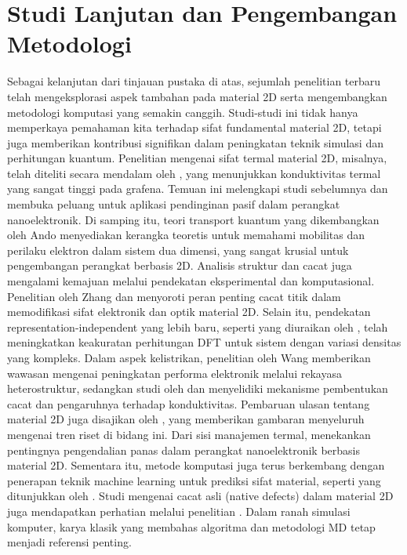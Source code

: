 \section{Studi Lanjutan dan Pengembangan Metodologi}
Sebagai kelanjutan dari tinjauan pustaka di atas, sejumlah penelitian terbaru telah mengeksplorasi aspek tambahan pada material 2D serta mengembangkan metodologi komputasi yang semakin canggih.
Studi-studi ini tidak hanya memperkaya pemahaman kita terhadap sifat fundamental material 2D, tetapi juga memberikan kontribusi signifikan dalam peningkatan teknik simulasi dan perhitungan kuantum.
Penelitian mengenai sifat termal material 2D, misalnya, telah diteliti secara mendalam oleh \citep{Khan2017}, yang menunjukkan konduktivitas termal yang sangat tinggi pada grafena.
Temuan ini melengkapi studi sebelumnya dan membuka peluang untuk aplikasi pendinginan pasif dalam perangkat nanoelektronik.
Di samping itu, teori transport kuantum yang dikembangkan oleh Ando \citep{ando_dynamical_2002} menyediakan kerangka teoretis untuk memahami mobilitas dan perilaku elektron dalam sistem dua dimensi, yang sangat krusial untuk pengembangan perangkat berbasis 2D.
Analisis struktur dan cacat juga mengalami kemajuan melalui pendekatan eksperimental dan komputasional.
Penelitian oleh Zhang \citep{Zhang2020} dan \citep{Slotman2013} menyoroti peran penting cacat titik dalam memodifikasi sifat elektronik dan optik material 2D.
Selain itu, pendekatan representation-independent yang lebih baru, seperti yang diuraikan oleh \citep{Shen2022}, telah meningkatkan keakuratan perhitungan DFT untuk sistem dengan variasi densitas yang kompleks.
Dalam aspek kelistrikan, penelitian oleh Wang \citep{Wang2017} memberikan wawasan mengenai peningkatan performa elektronik melalui rekayasa heterostruktur, sedangkan studi oleh \citep{Munro2020} dan \citep{Huang2012} menyelidiki mekanisme pembentukan cacat dan pengaruhnya terhadap konduktivitas.
Pembaruan ulasan tentang material 2D juga disajikan oleh \citep{Bhimanapati2016}, yang memberikan gambaran menyeluruh mengenai tren riset di bidang ini.
Dari sisi manajemen termal, \citep{Khan2017} menekankan pentingnya pengendalian panas dalam perangkat nanoelektronik berbasis material 2D.
Sementara itu, metode komputasi juga terus berkembang dengan penerapan teknik machine learning untuk prediksi sifat material, seperti yang ditunjukkan oleh \citep{Zheng2025}.
Studi mengenai cacat asli (native defects) dalam material 2D juga mendapatkan perhatian melalui penelitian \citep{Weston2018}.
Dalam ranah simulasi komputer, karya klasik yang membahas algoritma dan metodologi MD tetap menjadi referensi penting.
